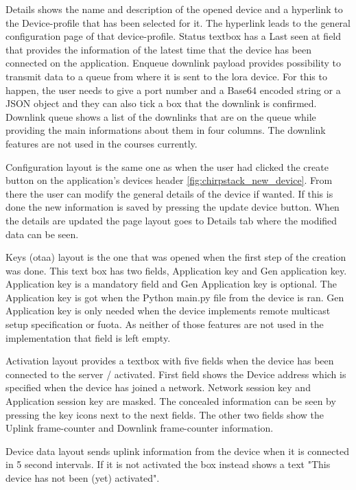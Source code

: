 Details shows the name and description of the opened device and a hyperlink to the Device-profile that has been selected for it.
The hyperlink leads to the general configuration page of that device-profile.
Status textbox has a Last seen at field that provides the information of the latest time that the device has been connected on the application.
Enqueue downlink payload provides possibility to transmit data to a queue from where it is sent to the \gls{lora} device. For this to happen, the user needs to give a port number and a Base64 encoded string or a JSON object and they can also tick a box  that the downlink is confirmed.
Downlink queue shows  a list of the downlinks that are on the queue while providing the main informations about them in four columns.
The downlink features are not used in the courses currently.

Configuration layout is the same one as when the user had clicked the create button on the application's devices header \ref{fig:chirpstack_new_device}.
From there the user can modify the general details of the device if wanted.
If this is done the new information is saved by pressing the update device button.
When the details are updated the page layout goes to Details tab where the modified data can be seen.

Keys (\gls{otaa}) layout is the one that was opened when the first step of the creation was done.
This text box has two fields, Application key and Gen application key.
Application key is a mandatory field and Gen Application key is optional.
The Application key is got when the Python main.py file from the device is ran.
Gen Application key is only needed when the device implements remote multicast setup specification or \gls{fuota}.
As neither of those features are not used in the implementation that field is left empty.

Activation layout provides a textbox with five fields when the device has been connected to the server / activated.
First field shows the Device address which is specified when the device has joined a network.
Network session key and Application session key are masked.
The concealed information can be seen by pressing the key icons next to the next fields.
The other two fields show the Uplink frame-counter and Downlink frame-counter information.

Device data layout sends uplink information from the device when it is connected in 5 second intervals.
If it is not activated the box instead shows a text "This device has not been (yet) activated".


